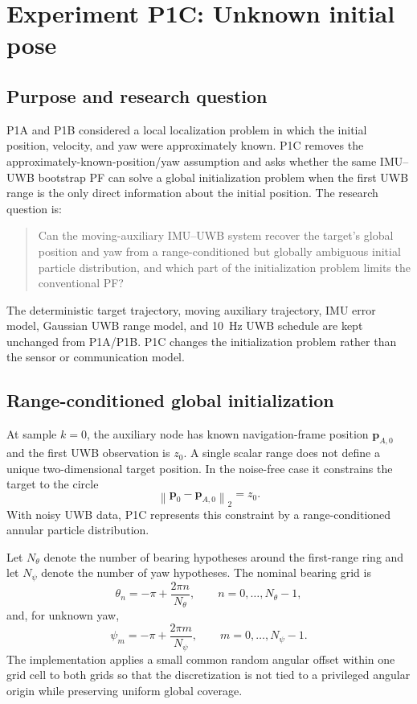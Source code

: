 \section{Experiment P1C: Unknown initial pose}
\subsection{Purpose and research question}
P1A and P1B considered a local localization problem in which the initial position, velocity, and yaw were approximately known. P1C removes the approximately-known-position/yaw assumption and asks whether the same IMU--UWB bootstrap PF can solve a global initialization problem when the first UWB range is the only direct information about the initial position. The research question is:
\begin{quote}
Can the moving-auxiliary IMU--UWB system recover the target's global position and yaw from a range-conditioned but globally ambiguous initial particle distribution, and which part of the initialization problem limits the conventional PF?
\end{quote}

The deterministic target trajectory, moving auxiliary trajectory, IMU error model, Gaussian UWB range model, and \SI{10}{Hz} UWB schedule are kept unchanged from P1A/P1B. P1C changes the initialization problem rather than the sensor or communication model.

\subsection{Range-conditioned global initialization}
At sample $k=0$, the auxiliary node has known navigation-frame position $\bm p_{A,0}$ and the first UWB observation is $z_0$. A single scalar range does not define a unique two-dimensional target position. In the noise-free case it constrains the target to the circle
\begin{equation}
\left\lVert \bm p_0-\bm p_{A,0}\right\rVert_2=z_0.
\end{equation}
With noisy UWB data, P1C represents this constraint by a range-conditioned annular particle distribution.

Let $N_{\theta}$ denote the number of bearing hypotheses around the first-range ring and let $N_{\psi}$ denote the number of yaw hypotheses. The nominal bearing grid is
\begin{equation}
\theta_n=-\pi+\frac{2\pi n}{N_{\theta}},
\qquad n=0,\ldots,N_{\theta}-1,
\end{equation}
and, for unknown yaw,
\begin{equation}
\psi_m=-\pi+\frac{2\pi m}{N_{\psi}},
\qquad m=0,\ldots,N_{\psi}-1.
\end{equation}
The implementation applies a small common random angular offset within one grid cell to both grids so that the discretization is not tied to a privileged angular origin while preserving uniform global coverage.

